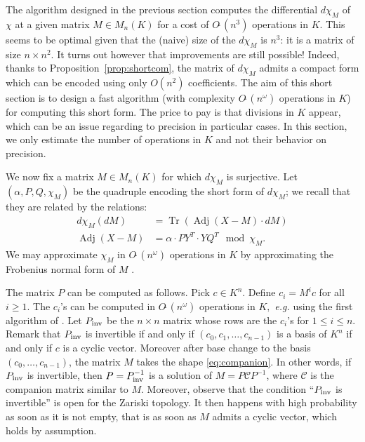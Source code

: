 \documentclass[sigconf]{acmart}
\DeclareMathOperator{\tr}{Tr}
\DeclareMathOperator{\adj}{Adj}
\newcommand{\softO}{O\tilde{~}}
\newcommand{\inv}{\text{\rm inv}}
\theoremstyle{definition}
\begin{document}
The algorithm designed in the previous section computes the differential 
$d \chi_M$ of $\chi$ at a given matrix $M \in M_n(K)$ for a cost of 
$\softO (n^3)$ operations in $K$. This seems to be optimal given that 
the (naive) size of the $d \chi_M$ is $n^3$: it is a matrix of size $n 
\times n^2$. It turns out however that improvements are still possible! 
Indeed, thanks to Proposition~\ref{prop:shortcom}, the matrix of $d 
\chi_M$ admits a compact form which can be encoded using only $O(n^2)$ 
coefficients. The aim of this short section is to design a fast 
algorithm (with complexity $\softO(n^\omega)$ operations in $K$) for 
computing this short form. The price to pay is that divisions in $K$ 
appear, which can be an issue regarding to precision in particular 
cases. In this section, we only estimate the number of operations in $K$ 
and not their behavior on precision.

We now fix a matrix $M \in M_n(K)$ for which $d \chi_M$ is 
surjective. Let $(\alpha, P, Q, \chi_M)$ be the quadruple encoding
the short form of $d \chi_M$; we recall that they are related by the
relations:
\begin{align*}
d \chi_M(dM) & =\tr(\adj(X{-}M) \cdot dM) \\
\adj(X{-}M) & = \alpha \cdot P Y^T \cdot Y Q^T \mod \chi_M.
\end{align*}
We may approximate $\chi_M$ in $\softO(n^\omega)$ operations in $K$
by approximating the Frobenius normal form of $M$ \cite{storjohann:01a}.

The matrix $P$ can be computed as follows. Pick $c \in K^n$. Define 
$c_i = M^i c$ for all $i \geq 1$. The $c_i$'s can be computed in 
$\softO(n^\omega)$ operations in $K,$ \textit{e.g.}
using the first algorithm
of \cite{keller-gehrig:85a}. Let $P_\inv$ be the 
$n \times n$ matrix whose rows are the $c_i$'s for $1 \leq i \leq n$. 
Remark that $P_\inv$ is invertible if and only if $(c_0, c_1, \ldots, 
c_{n-1})$ is a basis of $K^n$ if and only if $c$ is a cyclic vector. 
Moreover after base change to the basis $(c_0, \ldots, c_{n-1})$, the matrix 
$M$ takes the shape \eqref{eq:companion}. In other words, if $P_\inv$
is invertible, then $P = P_\inv^{-1}$ is a solution of $M = P \mathscr{C} P^{-1}$,
where $\mathscr{C}$ is the companion matrix similar to $M$.
Moreover, observe that the condition ``$P_\inv$ is invertible'' is open
for the Zariski topology. It then happens with high probability as soon
as it is not empty, that is as soon as $M$ admits a cyclic vector, which
holds by assumption.
\end{document}
